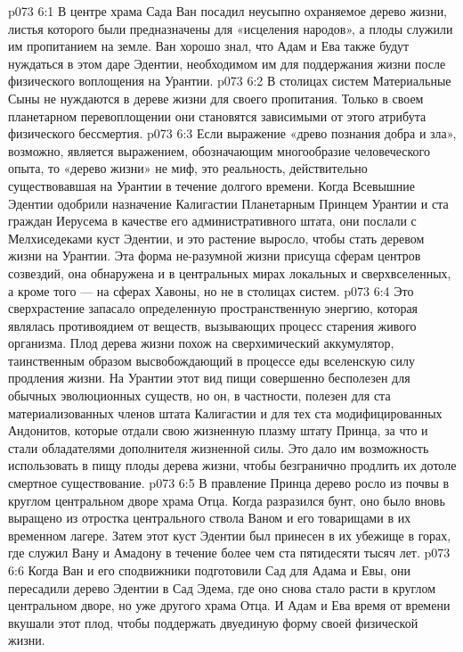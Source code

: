 \vs p073 6:1 В центре храма Сада Ван посадил неусыпно охраняемое дерево жизни, листья которого были предназначены для «исцеления народов», а плоды служили им пропитанием на земле. Ван хорошо знал, что Адам и Ева также будут нуждаться в этом даре Эдентии, необходимом им для поддержания жизни после физического воплощения на Урантии.
\vs p073 6:2 В столицах систем Материальные Сыны не нуждаются в дереве жизни для своего пропитания. Только в своем планетарном перевоплощении они становятся зависимыми от этого атрибута физического бессмертия.
\vs p073 6:3 \pc Если выражение «древо познания добра и зла», возможно, является выражением, обозначающим многообразие человеческого опыта, то «дерево жизни» не миф, это реальность, действительно существовавшая на Урантии в течение долгого времени. Когда Всевышние Эдентии одобрили назначение Калигастии Планетарным Принцем Урантии и ста граждан Иерусема в качестве его административного штата, они послали с Мелхиседеками куст Эдентии, и это растение выросло, чтобы стать деревом жизни на Урантии. Эта форма не\hyp{}разумной жизни присуща сферам центров созвездий, она обнаружена и в центральных мирах локальных и сверхвселенных, а кроме того --- на сферах Хавоны, но не в столицах систем.
\vs p073 6:4 Это сверхрастение запасало определенную пространственную энергию, которая являлась противоядием от веществ, вызывающих процесс старения живого организма. Плод дерева жизни похож на сверхимический аккумулятор, таинственным образом высвобождающий в процессе еды вселенскую силу продления жизни. На Урантии этот вид пищи совершенно бесполезен для обычных эволюционных существ, но он, в частности, полезен для ста материализованных членов штата Калигастии и для тех ста модифицированных Андонитов, которые отдали свою жизненную плазму штату Принца, за что и стали обладателями дополнителя жизненной силы. Это дало им возможность использовать в пищу плоды дерева жизни, чтобы безгранично продлить их дотоле смертное существование.
\vs p073 6:5 \pc В правление Принца дерево росло из почвы в круглом центральном дворе храма Отца. Когда разразился бунт, оно было вновь выращено из отростка центрального ствола Ваном и его товарищами в их временном лагере. Затем этот куст Эдентии был принесен в их убежище в горах, где служил Вану и Амадону в течение более чем ста пятидесяти тысяч лет.
\vs p073 6:6 Когда Ван и его сподвижники подготовили Сад для Адама и Евы, они пересадили дерево Эдентии в Сад Эдема, где оно снова стало расти в круглом центральном дворе, но уже другого храма Отца. И Адам и Ева время от времени вкушали этот плод, чтобы поддержать двуединую форму своей физической жизни.
